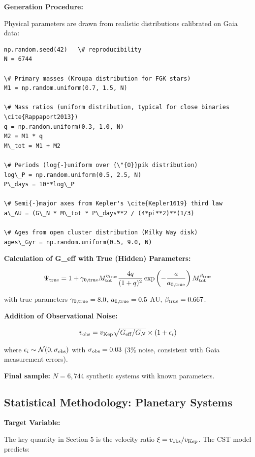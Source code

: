 \documentclass[10pt,a4paper]{article}
\begin{document}
\textbf{Generation Procedure:}

Physical parameters are drawn from realistic distributions calibrated on
Gaia data:

\begin{lstlisting}
np.random.seed(42)   \# reproducibility
N = 6744

\# Primary masses (Kroupa distribution for FGK stars)
M1 = np.random.uniform(0.7, 1.5, N)

\# Mass ratios (uniform distribution, typical for close binaries \cite{Rappaport2013})
q = np.random.uniform(0.3, 1.0, N)
M2 = M1 * q
M\_tot = M1 + M2

\# Periods (log{-}uniform over {\"{O}}pik distribution)
log\_P = np.random.uniform(0.5, 2.5, N)
P\_days = 10**log\_P

\# Semi{-}major axes from Kepler's \cite{Kepler1619} third law
a\_AU = (G\_N * M\_tot * P\_days**2 / (4*pi**2)**(1/3)

\# Ages from open cluster distribution (Milky Way disk)
ages\_Gyr = np.random.uniform(0.5, 9.0, N)
\end{lstlisting}

\textbf{Calculation of G\_eff with True (Hidden) Parameters:}

\[\Psi_{\rm true} = 1 + \gamma_{0,\rm true} M_{\rm tot}^{\eta_{\rm true}} \frac{4q}{(1+q)^2} \exp\left(-\frac{a}{a_{0,\rm true}}\right) M_{\rm tot}^{\beta_{\rm true}}\]

with true parameters \(\gamma_{0,\rm true} = 8.0\),
\(a_{0,\rm true} = 0.5\) AU, \(\beta_{\rm true} = 0.667\).

\textbf{Addition of Observational Noise:}

\[v_{\rm obs} = v_{\rm Kep} \sqrt{G_{\rm eff}/G_N} \times (1 + \epsilon_i)\]

where \(\epsilon_i \sim \mathcal{N}(0, \sigma_{\rm obs})\) with
\(\sigma_{\rm obs} = 0.03\) (3\% noise, consistent with Gaia measurement
errors).

\textbf{Final sample:} \(N = 6,744\) synthetic systems with known
parameters.

\subsection{Statistical Methodology: Planetary
Systems}\label{statistical-methodology-planetary-systems}

\textbf{Target Variable:}

The key quantity in Section 5 is the velocity ratio
\(\xi = v_{\rm obs}/v_{\rm Kep}\). The CST model predicts:
\end{document}
